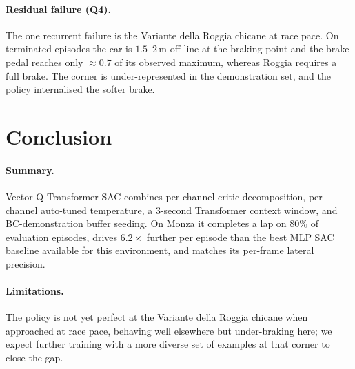 \documentclass{article}
\begin{document}
\paragraph{Residual failure (Q4).}
The one recurrent failure is the Variante della Roggia chicane at
race pace. On terminated episodes the car is $1.5$--$2$\,m off-line
at the braking point and the brake pedal reaches only $\approx 0.7$
of its observed maximum, whereas Roggia requires a full brake. The
corner is under-represented in the demonstration set, and the policy
internalised the softer brake.

\FloatBarrier
\section{Conclusion}
\label{sec:conclusion}

\paragraph{Summary.}
Vector-Q Transformer SAC combines per-channel critic decomposition,
per-channel auto-tuned temperature, a $3$-second Transformer context
window, and BC-demonstration buffer seeding. On Monza it completes a
lap on $80\%$ of evaluation episodes, drives $6.2\times$ further
per episode than the best MLP SAC baseline
available for this environment, and matches its per-frame lateral
precision.

\paragraph{Limitations.}
The policy is not yet perfect at the Variante della Roggia chicane
when approached at race pace, behaving well elsewhere but
under-braking here; we expect further training with a more diverse
set of examples at that corner to close the gap.
\end{document}

